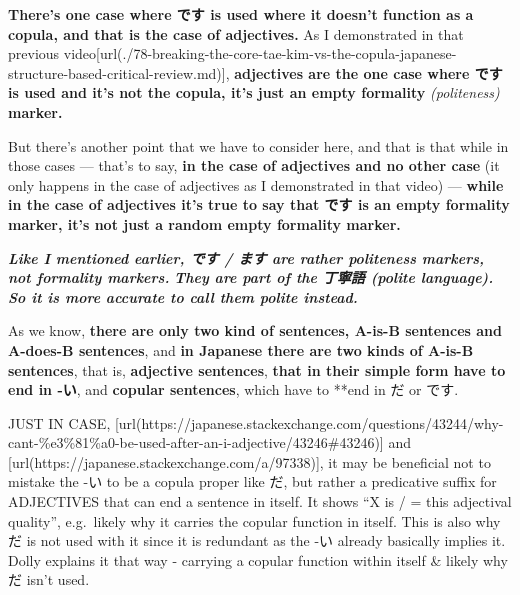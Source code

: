 \stopsectionlevel

\startsectionlevel[title={One case of です not functioning as a copula},reference={one-case-of-です-not-functioning-as-a-copula}]

{\bf There's one case where です is used where it doesn't function as a copula, and that is the case of adjectives.} As I demonstrated in that previous video\goto{{[}78{]}}[url(./78-breaking-the-core-tae-kim-vs-the-copula-japanese-structure-based-critical-review.md)], {\bf adjectives are the one case where です is used and it's not the copula, it's just an empty formality} {\em (politeness)} {\bf marker.}

{}

\startsectionlevel[title={です in adjectives is not just a random politeness marker},reference={です-in-adjectives-is-not-just-a-random-politeness-marker}]

But there's another point that we have to consider here, and that is that while in those cases --- that's to say, {\bf in the case of adjectives and no other case} (it only happens in the case of adjectives as I demonstrated in that video) --- {\bf while in the case of adjectives it's true to say that です is an empty formality marker, it's not just a random empty formality marker.}

{\bf {\em Like I mentioned earlier, です / ます are rather politeness markers, not formality markers.}} {\bf {\em They are part of the 丁寧語 (polite language). So it is more accurate to call them polite instead.}}

As we know, {\bf there are only two kind of sentences, A-is-B sentences and A-does-B sentences}, and {\bf in Japanese there are two kinds of A-is-B sentences}, that is, {\bf adjective sentences}, {\bf that in their simple form have to end in -い}, and {\bf copular sentences}, which have to **end in だ or です.

{}

JUST IN CASE, [url(https://japanese.stackexchange.com/questions/43244/why-cant-\%e3\%81\%a0-be-used-after-an-i-adjective/43246\#43246)] and [url(https://japanese.stackexchange.com/a/97338)], it may be beneficial not to mistake the -い to be a copula proper like だ, but rather a predicative suffix for ADJECTIVES that can end a sentence in itself.\crlf
It shows “X is / = this adjectival quality”, e.g.~likely why it carries the copular function in itself.\crlf
This is also why だ is not used with it since it is redundant as the -い already basically implies it.\crlf
Dolly explains it that way - carrying a copular function within itself & likely why だ isn't used.

